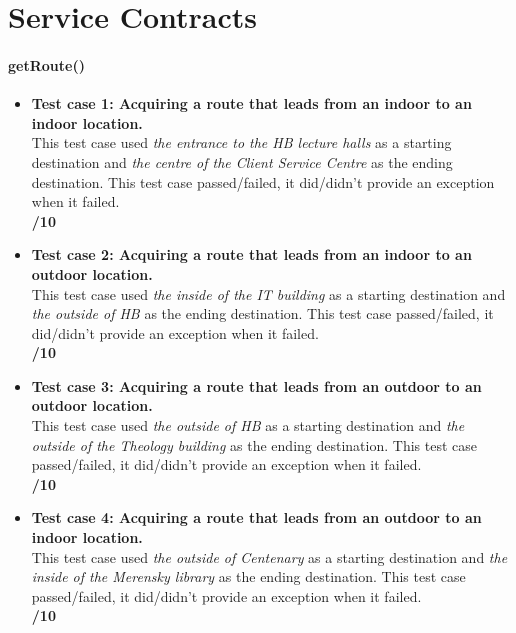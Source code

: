 \documentclass[runningheads,a4paper]{article}
\begin{document}



\begingroup



\tableofcontents


\endgroup

\newpage
	\section{Service Contracts}
	
	\paragraph{getRoute()}
		\begin{itemize}
			\item \textbf{Test case 1: Acquiring a route that leads from an indoor to an indoor location.} \\
							This test case used \textit{the entrance to the HB lecture halls} as a starting destination and \textit{the centre of the Client Service Centre} as the ending destination.
							This test case passed/failed, it did/didn't provide an exception when it failed.
							\\ \textbf{/10}
							
			\item \textbf{Test case 2: Acquiring a route that leads from an indoor to an outdoor location.} \\
							This test case used \textit{the inside of the IT building} as a starting destination and \textit{the outside of HB} as the ending destination.
							This test case passed/failed, it did/didn't provide an exception when it failed.
							\\ \textbf{/10}
							
			\item \textbf{Test case 3: Acquiring a route that leads from an outdoor to an outdoor location.} \\
							This test case used \textit{the outside of HB} as a starting destination and \textit{the outside of the Theology building} as the ending destination.
							This test case passed/failed, it did/didn't provide an exception when it failed.
							\\ \textbf{/10}
							
			\item \textbf{Test case 4: Acquiring a route that leads from an outdoor to an indoor location.} \\
							This test case used \textit{the outside of Centenary} as a starting destination and \textit{the inside of the Merensky library} as the ending destination. 
							This test case passed/failed, it did/didn't provide an exception when it failed.
							\\ \textbf{/10}
		\end{itemize}
		
\end{document}
